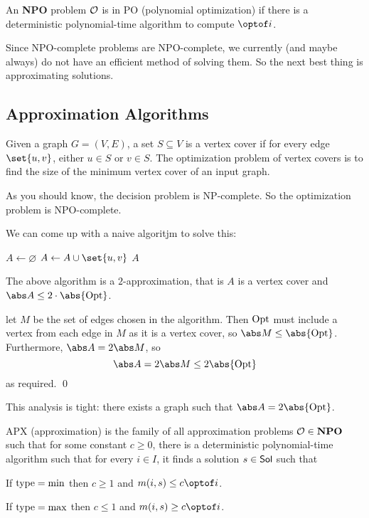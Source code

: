 \bdefn

    An {\bf NPO} problem ${\cal O}$ is in {\emphcolor PO} (polynomial optimization) if there is a deterministic polynomial-time algorithm to compute $\optof i$.

\edefn

Since NPO-complete problems are NPO-complete, we currently (and maybe always) do not have an efficient method of solving them.
So the next best thing is approximating solutions.

\subsection{Approximation Algorithms}

\bprob

    Given a graph $G=(V,E)$, a set $S\subseteq V$ is a {\emphcolor vertex cover} if for every edge $\set{u,v}$, either $u\in S$ or $v\in S$.
    The optimization problem of vertex covers is to find the size of the minimum vertex cover of an input graph.

\eprob

As you should know, the decision problem is NP-complete.
So the optimization problem is NPO-complete.

We can come up with a naive algoritjm to solve this:

\algorithm
        \State $A\gets\varnothing$
            \State $A\gets A\cup\set{u,v}$
        \EndWhile
        \State \Return $A$
    \EndFunc
\ealgorithm

\bthrm

    The above algorithm is a $2$-approximation, that is $A$ is a vertex cover and $\abs A\leq2\cdot\abs{\rm Opt}$.

\ethrm

\Proof let $M$ be the set of edges chosen in the algorithm.
Then ${\rm Opt}$ must include a vertex from each edge in $M$ as it is a vertex cover, so $\abs M\leq\abs{\rm Opt}$.
Furthermore, $\abs A=2\abs M$, so
$$ \abs A = 2\abs M \leq 2\abs{\rm Opt} $$
as required.
\qed

This analysis is tight: there exists a graph such that $\abs A=2\abs{\rm Opt}$.

\bdefn

    {\emphcolor APX} (approximation) is the family of all approximation problems ${\cal O}\in{\bf NPO}$ such that for some constant $c\geq0$, there is a deterministic polynomial-time algorithm such that for
    every $i\in I$, it finds a solution $s\in{\sf Sol}$ such that
    \benum
        \item If ${\rm type}=\min$ then $c\geq1$ and $m(i,s)\leq c\optof i$.
        \item If ${\rm type}=\max$ then $c\leq1$ and $m(i,s)\geq c\optof i$.
    \eenum

